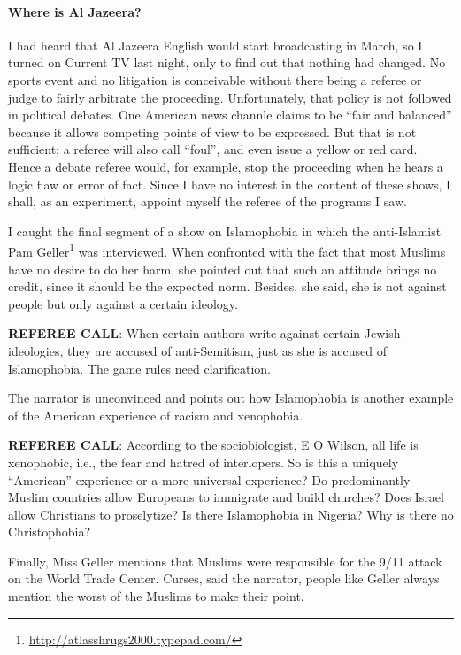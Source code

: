 \paragraph{Where is Al Jazeera?}


I had heard that Al Jazeera English would start broadcasting in March, so I turned on Current TV last night, only to find out that nothing had changed. No sports event and no litigation is conceivable without there being a referee or judge to fairly arbitrate the proceeding. Unfortunately, that policy is not followed in political debates. One American news channle claims to be ``fair and balanced'' because it allows competing points of view to be expressed. But that is not sufficient; a referee will also call ``foul'', and even issue a yellow or red card. Hence a debate referee would, for example, stop the proceeding when he hears a logic flaw or error of fact. Since I have no interest in the content of these shows, I shall, as an experiment, appoint myself the referee of the programs I saw.

I caught the final segment of a show on Islamophobia in which the anti-Islamist Pam Geller\footnote{\url{http://atlasshrugs2000.typepad.com/}} was interviewed. When confronted with the fact that most Muslims have no desire to do her harm, she pointed out that such an attitude brings no credit, since it should be the expected norm. Besides, she said, she is not against people but only against a certain ideology.

\textbf{REFEREE CALL}: When certain authors write against certain Jewish ideologies, they are accused of anti-Semitism, just as she is accused of Islamophobia. The game rules need clarification.

The narrator is unconvinced and points out how Islamophobia is another example of the American experience of racism and xenophobia.

\textbf{REFEREE CALL}: According to the sociobiologist, E O Wilson, all life is xenophobic, i.e., the fear and hatred of interlopers. So is this a uniquely ``American'' experience or a more universal experience? Do predominantly Muslim countries allow Europeans to immigrate and build churches? Does Israel allow Christians to proselytize? Is there Islamophobia in Nigeria? Why is there no Christophobia?

Finally, Miss Geller mentions that Muslims were responsible for the 9/11 attack on the World Trade Center. Curses, said the narrator, people like Geller always mention the worst of the Muslims to make their point.

